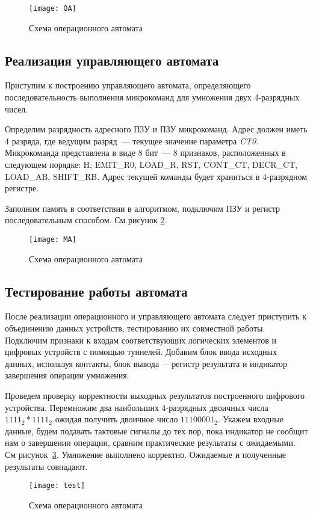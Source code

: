 \documentclass[a4paper,14pt]{extarticle}
\begin{document}
\begin{figure}[h!]
	\centering
	\texttt{[image: OA]}
	\caption {Схема операционного автомата}
	\label{img:oa1}
\end{figure}
\newpage
\subsection {Реализация управляющего автомата}
Приступим к построению управляющего автомата, определяющего последовательность выполнения микрокоманд для умножения двух 4-разрядных чисел. 

Определим разрядность адресного ПЗУ и ПЗУ микрокоманд. Адрес должен иметь 4 разряда, где ведущим разряд~--- текущее значение параметра \textit{CT0}. Микрокоманда представлена в виде 8 бит~--- 8 признаков, расположенных в следующем порядке: H, EMIT\_R0, LOAD\_R, RST, CONT\_CT, DECR\_CT, LOAD\_AB, SHIFT\_RB. Адрес текущей команды будет храниться в 4-разрядном регистре.


Заполним память в соответствии в алгоритмом, подключим ПЗУ и регистр последовательным способом. См рисунок \ref{img:ma1}.
\begin{figure}[h!]
	\centering
	\texttt{[image: MA]}
	\caption {Схема операционного автомата}
	\label{img:ma1}
\end{figure}

\subsection{Тестирование работы автомата}
После реализации операционного и управляющего автомата следует приступить к объединению данных устройств, тестированию их совместной работы. Подключим признаки к входам соответствующих логических элементов и цифровых устройств с помощью туннелей. Добавим блок ввода исходных данных, используя контакты, блок вывода~---регистр результата и индикатор завершения операции умножения.

Проведем проверку корректности выходных результатов построенного цифрового устройства. Перемножим два наибольших 4-разрядных двоичных числа $1111_2 \ast 1111_2$ ожидая получить двоичное число $11100001_2$. Укажем входные данные, будем подавать тактовые сигналы до тех пор, пока индикатор не сообщит нам о завершении операции, сравним практические результаты с ожидаемыми. См рисунок~\ref{img:test1}. Умножение выполнено корректно. Ожидаемые и полученные результаты совпадают.
\begin{figure}[h!]
	\centering
	\texttt{[image: test]}
	\caption {Схема операционного автомата}
	\label{img:test1}
\end{figure}
\end{document}
